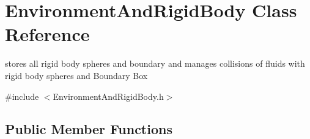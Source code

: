 \hypertarget{class_environment_and_rigid_body}{
\section{EnvironmentAndRigidBody Class Reference}
\label{class_environment_and_rigid_body}
}


stores all rigid body spheres and boundary and manages collisions of fluids with rigid body spheres and Boundary Box  




{\ttfamily \#include $<$EnvironmentAndRigidBody.h$>$}

\subsection*{Public Member Functions}
